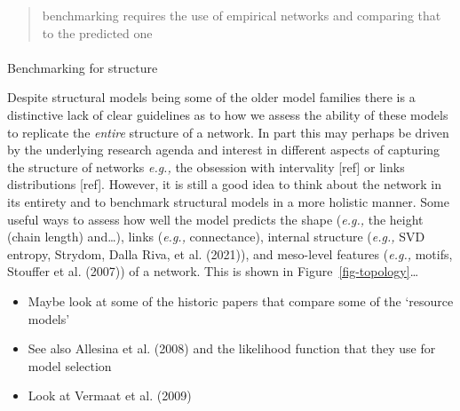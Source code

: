 \documentclass[
]{article}
\makeatletter
\let\oldparagraph\paragraph
\renewcommand{\paragraph}{
    \@ifstar
      \xxxParagraphStar
      \xxxParagraphNoStar
  }
\newcommand{\xxxParagraphStar}[1]{\oldparagraph*{#1}\mbox{}}
\newcommand{\xxxParagraphNoStar}[1]{\oldparagraph{#1}\mbox{}}
\makeatother
\begin{document}
\begin{quote}
benchmarking requires the use of empirical networks and comparing that
to the predicted one
\end{quote}

\paragraph{Benchmarking for structure}\label{benchmarking-for-structure}

Despite structural models being some of the older model families there
is a distinctive lack of clear guidelines as to how we assess the
ability of these models to replicate the \emph{entire} structure of a
network. In part this may perhaps be driven by the underlying research
agenda and interest in different aspects of capturing the structure of
networks \emph{e.g.,} the obsession with intervality {[}ref{]} or links
distributions {[}ref{]}. However, it is still a good idea to think about
the network in its entirety and to benchmark structural models in a more
holistic manner. Some useful ways to assess how well the model predicts
the shape (\emph{e.g.,} the height (chain length) and\ldots), links
(\emph{e.g.,} connectance), internal structure (\emph{e.g.,} SVD
entropy, Strydom, Dalla Riva, et al. (2021)), and meso-level features
(\emph{e.g.,} motifs, Stouffer et al. (2007)) of a network. This is
shown in Figure~\ref{fig-topology}\ldots{}

\begin{itemize}
\item
  Maybe look at some of the historic papers that compare some of the
  `resource models'
\item
  See also Allesina et al. (2008) and the likelihood function that they
  use for model selection
\item
  Look at Vermaat et al. (2009)
\end{itemize}
\end{document}
